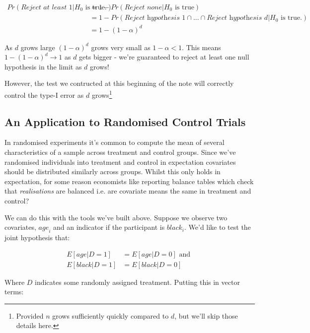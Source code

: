 \documentclass{article}
\begin{document}
    \begin{align*}
        Pr(\textit{Reject at least } 1 | H_0 \text{ is true.}) &= 1 - Pr(\textit{Reject none} | H_0 \text{ is true}) \\
        &= 1 - Pr(\textit{Reject hypothesis 1} \cap  ... \cap \textit{Reject hypothesis d} | H_0 \text{ is true.}) \\
        &= 1 - (1 - \alpha)^d
    \end{align*}


    As $d$ grows large $(1 - \alpha)^d$ grows very small as $1 - \alpha < 1$. This means
    $1 - (1 - \alpha)^d \rightarrow 1$ as $d$ gets bigger - we're guaranteed to 
    reject at least one null hypothesis in the limit as $d$ grows!


    However, the test we contructed at this beginning of the note will correctly 
    control the type-I error as $d$ grows\footnote{Provided $n$ grows sufficiently 
    quickly compared to $d$, but we'll skip those details here.}




    \subsection*{An Application to Randomised Control Trials}


    In randomised experiments it's common to compute the mean of several 
    characteristics of a sample across treatment and control groups.  Since we've
    randomised individuals into treatment and control in expectation covariates 
    should be distributed similarly across groups. Whilst this only holds in 
    expectation, for some reason economists like reporting balance tables which 
    check that \textit{realisations} are balanced i.e. are covariate means the same 
    in treatment and control?


    We can do this with the tools we've built above. Suppose we observe two 
    covariates, $\textit{age}_i$ and an indicator if the participant is $\textit{black}_i$.
    We'd like to test the joint hypothesis that:

    \begin{align*}
        E[age | D = 1] &= E[age | D = 0] \text{ and }\\
        E[black | D = 1] &= E[black | D = 0]
    \end{align*}
   
    
Where $D$ indicates some randomly assigned treatment. Putting this in vector terms:
\end{document}
